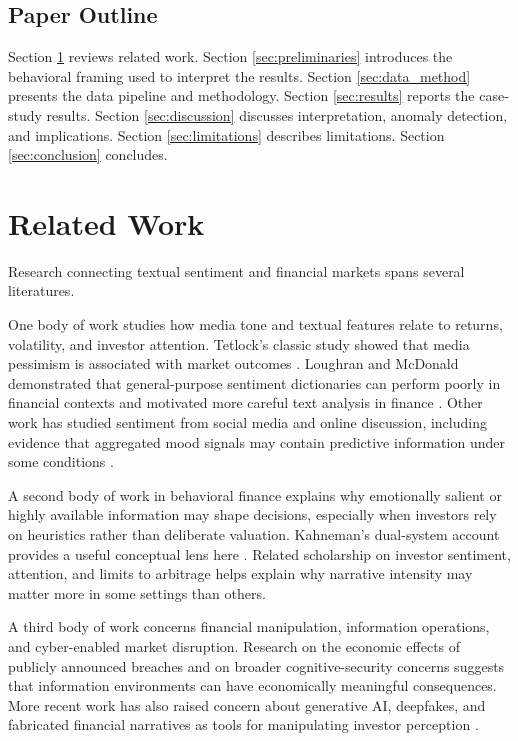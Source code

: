 \documentclass[lettersize,journal]{IEEEtran}
\begin{document}
\subsection{Paper Outline}
Section \ref{sec:related} reviews related work. Section \ref{sec:preliminaries} introduces the behavioral framing used to interpret the results. Section \ref{sec:data_method} presents the data pipeline and methodology. Section \ref{sec:results} reports the case-study results. Section \ref{sec:discussion} discusses interpretation, anomaly detection, and implications. Section \ref{sec:limitations} describes limitations. Section \ref{sec:conclusion} concludes.

\section{Related Work}
\label{sec:related}
Research connecting textual sentiment and financial markets spans several literatures.

One body of work studies how media tone and textual features relate to returns, volatility, and investor attention. Tetlock's classic study showed that media pessimism is associated with market outcomes \cite{tetlock2007giving}. Loughran and McDonald demonstrated that general-purpose sentiment dictionaries can perform poorly in financial contexts and motivated more careful text analysis in finance \cite{loughran2011liability}. Other work has studied sentiment from social media and online discussion, including evidence that aggregated mood signals may contain predictive information under some conditions \cite{bollen2011twitter,zhang2020stock}.

A second body of work in behavioral finance explains why emotionally salient or highly available information may shape decisions, especially when investors rely on heuristics rather than deliberate valuation. Kahneman's dual-system account provides a useful conceptual lens here \cite{kahneman2011thinking}. Related scholarship on investor sentiment, attention, and limits to arbitrage helps explain why narrative intensity may matter more in some settings than others.

A third body of work concerns financial manipulation, information operations, and cyber-enabled market disruption. Research on the economic effects of publicly announced breaches \cite{10.5555/876661.876669} and on broader cognitive-security concerns suggests that information environments can have economically meaningful consequences. More recent work has also raised concern about generative AI, deepfakes, and fabricated financial narratives as tools for manipulating investor perception \cite{shamo2024deepfake}.
\end{document}
